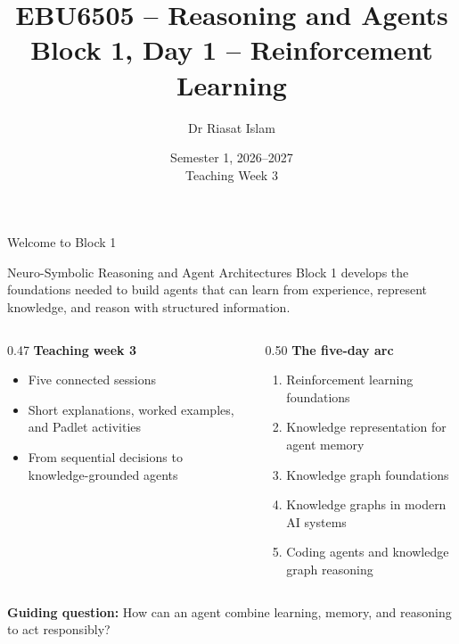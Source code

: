 \documentclass[aspectratio=169]{beamer}
\title[EBU6505 Block 1 Day 1]{EBU6505 -- Reasoning and Agents\\Block 1, Day 1 -- Reinforcement Learning}
\author{Dr Riasat Islam}
\institute{Queen Mary University of London}
\date[Teaching Week 3]{Semester 1, 2026--2027 \\ Teaching Week 3}
\newcommand{\defaultdeckrefs}{AIMA4e Ch.22 pp.789--822; Poole3e Ch.13 pp.583--608}
\newcommand{\currentsliderefs}{\defaultdeckrefs}
\newcommand{\setslideref}[1]{\gdef\currentsliderefs{#1}}
\begin{document}
\setslideref{AIMA4e Ch.22 pp.789--822; Poole3e Ch.13 pp.583--608}
\begin{frame}
  \titlepage
\end{frame}

\setslideref{AIMA4e Ch.10, Ch.17, and Ch.22; Poole3e Ch.12--13}
\begin{frame}{Welcome to Block 1}
\begin{block}{Neuro-Symbolic Reasoning and Agent Architectures}
Block 1 develops the foundations needed to build agents that can learn from
experience, represent knowledge, and reason with structured information.
\end{block}

\begin{columns}[T]
  \begin{column}{0.47\textwidth}
    \textbf{Teaching week 3}
    \begin{itemize}
      \item Five connected sessions
      \item Short explanations, worked examples, and Padlet activities
      \item From sequential decisions to knowledge-grounded agents
    \end{itemize}
  \end{column}
  \begin{column}{0.50\textwidth}
    \textbf{The five-day arc}
    \begin{enumerate}
      \item Reinforcement learning foundations
      \item Knowledge representation for agent memory
      \item Knowledge graph foundations
      \item Knowledge graphs in modern AI systems
      \item Coding agents and knowledge graph reasoning
    \end{enumerate}
  \end{column}
\end{columns}

\vspace{0.2cm}
\begin{center}
\textbf{Guiding question:} How can an agent combine learning, memory, and
reasoning to act responsibly?
\end{center}
\end{frame}
\end{document}
